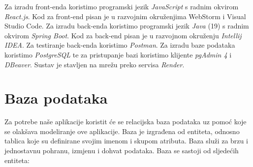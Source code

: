 	\bigskip
	Za izradu front-enda koristimo programski jezik \textit{JavaScript} s radnim okvirom \textit{React.js}. Kod za front-end pisan je u razvojnim okruženjima WebStorm i Visual Studio Code. Za izradu back-enda koristimo programski jezik \textit{Java} (19) s radnim okvirom \textit{Spring Boot}. Kod za back-end pisan je u razvojnom okruženju \textit{Intellij IDEA}. Za testiranje back-enda koristimo \textit{Postman}. Za izradu baze podataka koristimo \textit{PostgreSQL} te za pristupanje bazi koristimo klijente \textit{pgAdmin 4} i \textit{DBeaver}. Sustav je stavljen na mrežu preko servisa \textit{Render}.
	\pagebreak

		\section{Baza podataka}



		Za potrebe naše aplikacije koristit će se relacijska baza podataka uz pomoć koje se olakšava modeliranje ove aplikacije. Baza je izgrađena od entiteta, odnosno tablica koje su definirane svojim imenom i skupom atributa. Baza služi za brzu i jednostavnu pohranu, izmjenu i dohvat podataka. Baza se sastoji od sljedećih entiteta:


